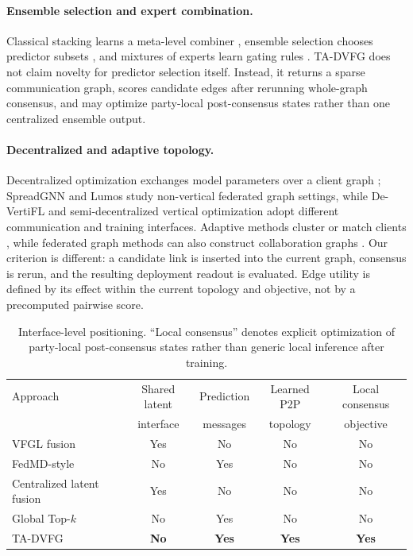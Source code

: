 \documentclass[letterpaper]{article} %
\newcommand{\method}{\textsc{TA-DVFG}}
\begin{document}
\paragraph{Ensemble selection and expert combination.}
Classical stacking learns a meta-level combiner
\cite{wolpert1992stacked}, ensemble selection chooses predictor subsets
\cite{caruana2004ensemble}, and mixtures of experts learn gating rules
\cite{jacobs1991moe}. \method{} does not claim novelty for predictor selection
itself. Instead, it returns a sparse communication graph, scores candidate edges
after rerunning whole-graph consensus, and may optimize party-local
post-consensus states rather than one centralized ensemble output.

\paragraph{Decentralized and adaptive topology.}
Decentralized optimization exchanges model parameters over a client graph
\cite{lian2017dpsgd}; SpreadGNN \cite{he2022spreadgnn} and Lumos
\cite{pan2023lumos} study non-vertical federated graph settings, while
De-VertiFL \cite{huertas2024devertifl} and semi-decentralized vertical
optimization \cite{valdeira2023mtcd} adopt different communication and training
interfaces. Adaptive methods cluster or match clients
\cite{sattler2020clustered,li2022panm}, while federated graph methods can also
construct collaboration graphs
\cite{zhong2024spreadfgl,guo2025dfedsst}. Our criterion is different: a
candidate link is inserted into the current graph, consensus is rerun, and the
resulting deployment readout is evaluated. Edge utility is defined by its effect within the current topology and
objective, not by a precomputed pairwise score.

\begin{table}[t]
\centering
\scriptsize
\setlength{\tabcolsep}{2.5pt}
\caption{Interface-level positioning. ``Local consensus'' denotes explicit
optimization of party-local post-consensus states rather than generic local
inference after training.}
\label{tab:positioning}
\begin{tabular}{lcccc}
\toprule
Approach & Shared latent & Prediction & Learned P2P & Local consensus \\
 & interface & messages & topology & objective \\
\midrule
VFGL fusion & Yes & No & No & No \\
FedMD-style & No & Yes & No & No \\
Centralized latent fusion & Yes & No & No & No \\
Global Top-$k$ & No & Yes & No & No \\
\method{} & \textbf{No} & \textbf{Yes} & \textbf{Yes} & \textbf{Yes} \\
\bottomrule
\end{tabular}
\end{table}
\end{document}
